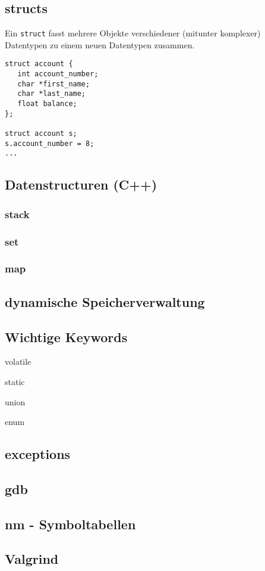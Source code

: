 \subsection{structs}
Ein \texttt{struct} fasst mehrere Objekte verschiedener (mitunter komplexer) Datentypen zu einem neuen Datentypen zusammen.

\begin{lstlisting}
struct account {
   int account_number;
   char *first_name;
   char *last_name;
   float balance;
};

struct account s;
s.account_number = 8;
...
\end{lstlisting}

\subsection{Datenstructuren (C++)}

\subsubsection*{stack}

\subsubsection*{set}

\subsubsection*{map}

\subsection{dynamische Speicherverwaltung}

\subsection{Wichtige Keywords}
	\begin{description}
	\item volatile
	\item static
	\item union
	\item enum
	\end{description}

\subsection{exceptions}
	
\subsection{gdb}

\subsection{nm - Symboltabellen}

\subsection{Valgrind}


